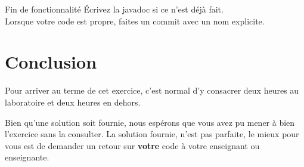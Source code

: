 \documentclass[a4paper,11pt]{style-esi/td}
\newcommand{\findefonctionnalite}{
\begin{infoit}{Fin de fonctionnalité}
	Écrivez la javadoc si ce n'est déjà fait.\\  
	Lorsque votre code est propre, faites un commit avec un nom explicite. 
\end{infoit}
}
\begin{document}
\findefonctionnalite 

\section{Conclusion}

Pour arriver au terme de cet exercice, c'est normal d'y consacrer deux heures au 
laboratoire et deux heures en dehors. 

Bien qu'une solution soit fournie, nous espérons que vous avez pu mener à bien
l'exercice sans la consulter. La solution fournie, n'est pas parfaite, le mieux
pour vous est de demander un retour sur \textbf{votre} code à votre enseignant
ou enseignante. 
\end{document}
